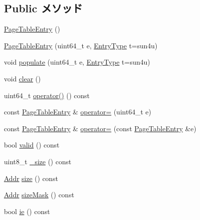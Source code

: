 \subsection*{Public メソッド}
\begin{DoxyCompactItemize}
\item 
\hyperlink{classSparcISA_1_1PageTableEntry_aed17530aff71992643e0f0280c7f9f59}{PageTableEntry} ()
\item 
\hyperlink{classSparcISA_1_1PageTableEntry_a4cd1402d0876ca3663d8664ca788f67b}{PageTableEntry} (uint64\_\-t e, \hyperlink{classSparcISA_1_1PageTableEntry_a9ed8d16c9ae7fae285dd2146c3159023}{EntryType} t=sun4u)
\item 
void \hyperlink{classSparcISA_1_1PageTableEntry_af79a5e3d40cb4f820fc2e7be1da4b1a4}{populate} (uint64\_\-t e, \hyperlink{classSparcISA_1_1PageTableEntry_a9ed8d16c9ae7fae285dd2146c3159023}{EntryType} t=sun4u)
\item 
void \hyperlink{classSparcISA_1_1PageTableEntry_ac8bb3912a3ce86b15842e79d0b421204}{clear} ()
\item 
uint64\_\-t \hyperlink{classSparcISA_1_1PageTableEntry_a6d017c2a4bca6a40f6f3a6db95ccaf67}{operator()} () const 
\item 
const \hyperlink{classSparcISA_1_1PageTableEntry}{PageTableEntry} \& \hyperlink{classSparcISA_1_1PageTableEntry_aa0ab0fbd3211d9dbc19476a3f0bb0ab8}{operator=} (uint64\_\-t e)
\item 
const \hyperlink{classSparcISA_1_1PageTableEntry}{PageTableEntry} \& \hyperlink{classSparcISA_1_1PageTableEntry_a3dc2db6c9f4ed3f6e9a5b199307a78e0}{operator=} (const \hyperlink{classSparcISA_1_1PageTableEntry}{PageTableEntry} \&e)
\item 
bool \hyperlink{classSparcISA_1_1PageTableEntry_a8d985300b138b6c5556ab17ed4df3b38}{valid} () const 
\item 
uint8\_\-t \hyperlink{classSparcISA_1_1PageTableEntry_a5bdbfa324a12a8bb02b6505e6a40a47f}{\_\-size} () const 
\item 
\hyperlink{base_2types_8hh_af1bb03d6a4ee096394a6749f0a169232}{Addr} \hyperlink{classSparcISA_1_1PageTableEntry_ade0faa4f478bf244b35fb208d640c648}{size} () const 
\item 
\hyperlink{base_2types_8hh_af1bb03d6a4ee096394a6749f0a169232}{Addr} \hyperlink{classSparcISA_1_1PageTableEntry_a3dedb9334b52f72e0786fe02f80735c0}{sizeMask} () const 
\item 
bool \hyperlink{classSparcISA_1_1PageTableEntry_abb56ec9b439677c36b13bbc4a1cf5491}{ie} () const 
\item 

\end{DoxyCompactItemize}
